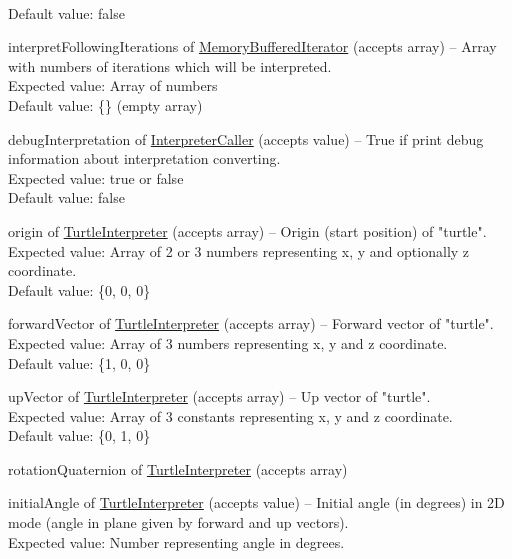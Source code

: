 \begin{description*}
			\\ Default value: false
		\item[interpretFollowingIterations] of \hyperref[Malsys.Processing.Components.RewriterIterators.MemoryBufferedIterator]{MemoryBufferedIterator}
		(accepts array)
			-- Array with numbers of iterations which will be interpreted.
			\\ Expected value: Array of numbers
			\\ Default value: \{\} (empty array)
		\item[debugInterpretation] of \hyperref[Malsys.Processing.Components.Interpreters.InterpreterCaller]{InterpreterCaller}
		(accepts value)
			-- True if print debug information about interpretation converting.
			\\ Expected value: true or false
			\\ Default value: false
		\item[origin] of \hyperref[Malsys.Processing.Components.Interpreters.TurtleInterpreter]{TurtleInterpreter}
		(accepts array)
			-- Origin (start position) of "turtle".
			\\ Expected value: Array of 2 or 3 numbers representing x, y and optionally z coordinate.
			\\ Default value: \{0, 0, 0\}
		\item[forwardVector] of \hyperref[Malsys.Processing.Components.Interpreters.TurtleInterpreter]{TurtleInterpreter}
		(accepts array)
			-- Forward vector of "turtle".
			\\ Expected value: Array of 3 numbers representing x, y and z coordinate.
			\\ Default value: \{1, 0, 0\}
		\item[upVector] of \hyperref[Malsys.Processing.Components.Interpreters.TurtleInterpreter]{TurtleInterpreter}
		(accepts array)
			-- Up vector of "turtle".
			\\ Expected value: Array of 3 constants representing x, y and z coordinate.
			\\ Default value: \{0, 1, 0\}
		\item[rotationQuaternion] of \hyperref[Malsys.Processing.Components.Interpreters.TurtleInterpreter]{TurtleInterpreter}
		(accepts array)
		\item[initialAngle] of \hyperref[Malsys.Processing.Components.Interpreters.TurtleInterpreter]{TurtleInterpreter}
		(accepts value)
			-- Initial angle (in degrees) in 2D mode (angle in plane given by forward and up vectors).
			\\ Expected value: Number representing angle in degrees.

\end{description*}
